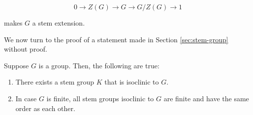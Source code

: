 $$0 \to Z(G) \to G \to G/Z(G) \to 1$$

makes $G$ a stem extension.

We now turn to the proof of a statement made in Section
\ref{sec:stem-group} without proof.

\begin{theorem}\label{thm:stem-group-existence}
  Suppose $G$ is a group. Then, the following are true:

  \begin{enumerate}
  \item There exists a stem group $K$ that is isoclinic to $G$.
  \item In case $G$ is finite, all stem groups isoclinic to $G$ are
    finite and have the same order as each other.
  \end{enumerate}
\end{theorem}

